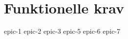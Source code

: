 \chapter{Funktionelle krav}

{epic-1}
{epic-2}\newpage
{epic-3}\newpage
{epic-5}\newpage
{epic-6}\newpage
{epic-7}\newpage